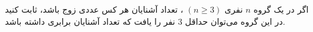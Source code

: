 \EXERCISE
اگر در یک گروه
$n$
نفری
$(n \geq 3)$
، تعداد آشنایان هر کس عددی زوج باشد، ثابت کنید در این گروه می‌توان حداقل
$3$
نفر را یافت که تعداد آشنایان برابری داشته باشد.